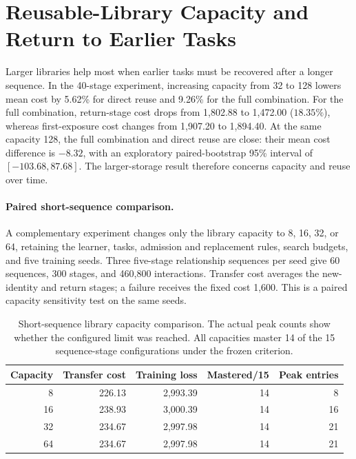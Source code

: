 \section{Reusable-Library Capacity and Return to Earlier Tasks}
\label{app:revision_capacity}

Larger libraries help most when earlier tasks must be recovered after a longer
sequence. In the 40-stage experiment, increasing capacity from 32 to 128 lowers
mean cost by 5.62\% for direct reuse and 9.26\% for the full combination.
For the full combination, return-stage cost drops from 1,802.88 to 1,472.00
($18.35\%$), whereas first-exposure cost changes from 1,907.20 to 1,894.40.
At the same capacity 128, the full combination and direct reuse are close:
their mean cost difference is $-8.32$, with an exploratory paired-bootstrap
95\% interval of $[-103.68,87.68]$. The larger-storage result therefore concerns
capacity and reuse over time.

\paragraph{Paired short-sequence comparison.}
A complementary experiment changes only the library capacity to 8, 16, 32, or
64, retaining the learner, tasks, admission and replacement rules, search
budgets, and five training seeds. Three five-stage relationship sequences per
seed give 60 sequences, 300 stages, and 460,800 interactions. Transfer cost
averages the new-identity and return stages; a failure receives the fixed cost
1,600. This is a paired capacity sensitivity test on the same seeds.

\begin{table}[tb]
\centering
\small
\caption{Short-sequence library capacity comparison. The actual peak counts
show whether the configured limit was reached. All capacities master 14 of the
15 sequence-stage configurations under the frozen criterion.}
\label{tab:revision_capacity_short}
\begin{tabular}{rrrrr}
\toprule
Capacity & Transfer cost & Training loss & Mastered/15 & Peak entries \\
\midrule
8 & 226.13 & 2,993.39 & 14 & 8 \\
16 & 238.93 & 3,000.39 & 14 & 16 \\
32 & 234.67 & 2,997.98 & 14 & 21 \\
64 & 234.67 & 2,997.98 & 14 & 21 \\
\bottomrule
\end{tabular}
\end{table}


